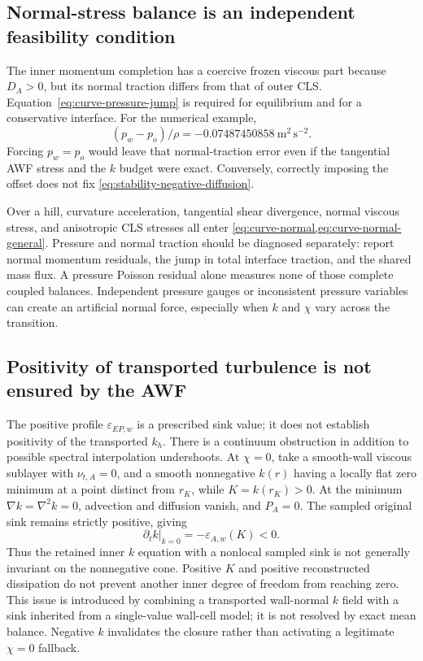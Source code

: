 \documentclass[11pt,a4paper]{article}
\numberwithin{equation}{section}
\newcommand{\eps}{\varepsilon}
\newcommand{\EAw}{\eps_{A,w}}
\newcommand{\EEP}{\eps_{EP,w}}
\begin{document}
\subsection{Normal-stress balance is an independent feasibility condition}
The inner momentum completion has a coercive frozen viscous part
because $D_A>0$, but its normal traction differs from that of outer
CLS. Equation~\eqref{eq:curve-pressure-jump} is required for equilibrium
and for a conservative interface. For the numerical example,
\begin{equation}
 (p_w-p_o)/\rho=-0.07487450858\ \mathrm{m^2\,s^{-2}}.
 \label{eq:stability-pressure-example}
\end{equation}
Forcing $p_w=p_o$ would leave that normal-traction error even if the
tangential AWF stress and the $k$ budget were exact. Conversely,
correctly imposing the offset does not fix
\cref{eq:stability-negative-diffusion}.

Over a hill, curvature acceleration, tangential shear divergence,
normal viscous stress, and anisotropic CLS stresses all enter
\cref{eq:curve-normal,eq:curve-normal-general}. Pressure and normal
traction should be diagnosed separately: report normal momentum
residuals, the jump in total interface traction, and the shared mass
flux. A pressure Poisson residual alone measures none of those
complete coupled balances. Independent pressure gauges or inconsistent
pressure variables can create an artificial normal force, especially
when $k$ and $\chi$ vary across the transition.

\subsection{Positivity of transported turbulence is not ensured by the AWF}
The positive profile $\EEP$ is a prescribed sink value; it does not
establish positivity of the transported $k_h$. There is a continuum
obstruction in addition to possible spectral interpolation undershoots.
At $\chi=0$, take a smooth-wall viscous sublayer with
$\nu_{t,A}=0$, and a smooth nonnegative $k(r)$ having a locally flat
zero minimum at a point distinct from $r_K$, while
$K=k(r_K)>0$. At the minimum $\nabla k=\nabla^2k=0$, advection
and diffusion vanish, and $P_A=0$. The sampled original sink remains
strictly positive, giving
\begin{equation}
 \left.\partial_t k\right|_{k=0}
 =-\EAw(K)<0.
 \label{eq:stability-k-cone}
\end{equation}
Thus the retained inner $k$ equation with a nonlocal sampled sink is
not generally invariant on the nonnegative cone. Positive $K$ and
positive reconstructed dissipation do not prevent another inner
degree of freedom from reaching zero. This issue is introduced by
combining a transported wall-normal $k$ field with a sink inherited
from a single-value wall-cell model; it is not resolved by exact mean
balance. Negative $k$ invalidates the closure rather than activating
a legitimate $\chi=0$ fallback.
\end{document}
